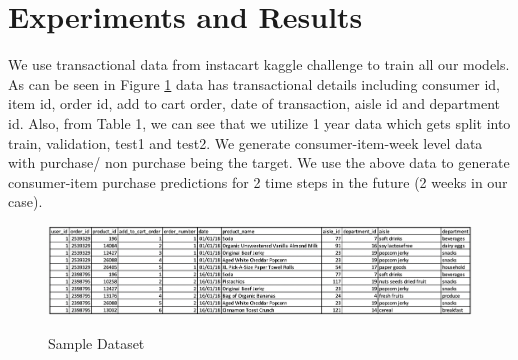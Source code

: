 \section{Experiments and Results}
\label{sec:eval}
We use transactional data from instacart kaggle challenge to train all our models. As can 
be seen in Figure \ref{fig:sampledata} data has transactional details including consumer id, item id, 
order id, add to cart order, date of transaction, aisle id and department id.
Also, from Table 1, we can see that we utilize 1 year data which gets split into train, validation,
test1 and test2. We generate consumer-item-week level data with purchase/ non purchase being the target.
We use the above data to generate consumer-item purchase predictions for 2 time steps in the future (2 weeks in our case).
 \begin{figure}[!t]
    \centering 
    \caption{Sample Dataset} 
    \includegraphics[width=5.5in]{img/sampledata.png} 
    \label{fig:sampledata} 
  \end{figure}